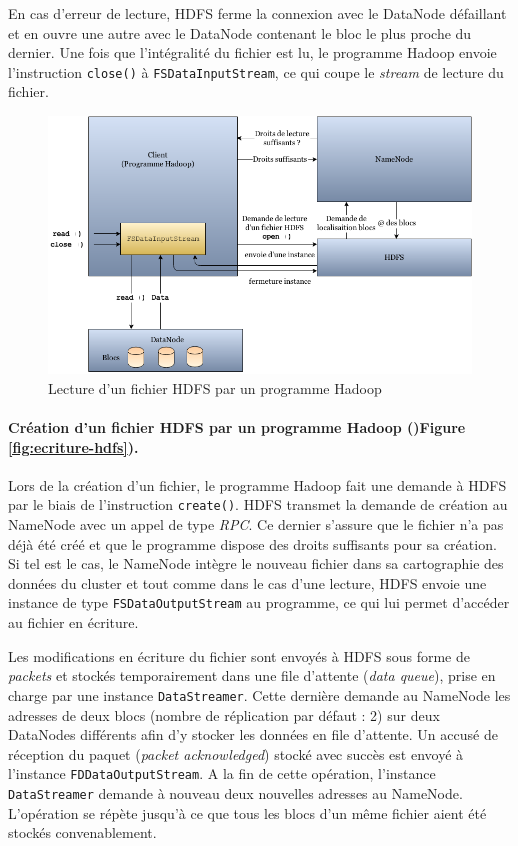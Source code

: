 \par En cas d'erreur de lecture, HDFS ferme la connexion avec le DataNode défaillant et en ouvre une autre avec le DataNode contenant le bloc le plus proche du dernier. Une fois que l'intégralité du fichier est lu, le programme Hadoop envoie l'instruction \texttt{close()} à \texttt{FSDataInputStream}, ce qui coupe le \textit{stream} de lecture du fichier.

\begin{figure}[h!]
  \centering
  \includegraphics[width=16cm]{images/reading_file.png}
  \caption{Lecture d'un fichier HDFS par un programme Hadoop}
  \label{fig:lecture-hdfs}
\end{figure}

\paragraph{Création d'un fichier HDFS par un programme Hadoop ()Figure \ref{fig:ecriture-hdfs}).} Lors de la création d'un fichier, le programme Hadoop fait une demande à HDFS par le biais de l'instruction \texttt{create()}. HDFS transmet la demande de création au NameNode avec un appel de type \textit{RPC}. Ce dernier s'assure que le fichier n'a pas déjà été créé et que le programme dispose des droits suffisants pour sa création. Si tel est le cas, le NameNode intègre le nouveau fichier dans sa cartographie des données du cluster et tout comme dans le cas d'une lecture, HDFS envoie une instance de type \texttt{FSDataOutputStream} au programme, ce qui lui permet d'accéder au fichier en écriture.

\par Les modifications en écriture du fichier sont envoyés à HDFS sous forme de \textit{packets} et stockés temporairement dans une file d'attente (\textit{data queue}), prise en charge par une instance \texttt{DataStreamer}. Cette dernière demande au NameNode les adresses de deux blocs (nombre de réplication par défaut : 2) sur deux DataNodes différents afin d'y stocker les données en file d'attente. Un accusé de réception du paquet (\textit{packet acknowledged}) stocké avec succès est envoyé à l'instance \texttt{FDDataOutputStream}. A la fin de cette opération, l'instance \texttt{DataStreamer} demande à nouveau deux nouvelles adresses au NameNode. L'opération se répète jusqu'à ce que tous les blocs d'un même fichier aient été stockés convenablement.


